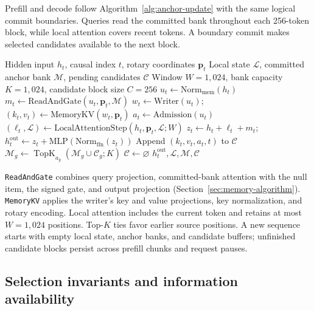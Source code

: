 Prefill and decode follow Algorithm~\ref{alg:anchor-update} with the same logical commit boundaries. Queries read the committed bank throughout each 256-token block, while local attention covers recent tokens. A boundary commit makes selected candidates available to the next block.

\begin{algorithm}[!htbp]
\caption{Causal RMA update in one local-plus-RMA layer}
\label{alg:anchor-update}
\small
\begin{algorithmic}[1]
\Require Hidden input $h_t$, causal index $t$, rotary coordinates $\mathbf p_t$
\Require Local state $\mathcal L$, committed anchor bank $\mathcal M$, pending candidates $\mathcal C$
\Require Window $W=1{,}024$, bank capacity $K=1{,}024$, candidate block size $C=256$
\State $u_t\gets\mathrm{Norm}_{\mathrm{mem}}(h_t)$
\State $m_t\gets\mathrm{ReadAndGate}(u_t,\mathbf p_t,\mathcal M)$ 
\State $w_t\gets\mathrm{Writer}(u_t)$; $(k_t,v_t)\gets\mathrm{MemoryKV}(w_t,\mathbf p_t)$
\State $a_t\gets\mathrm{Admission}(u_t)$ 
\State $(\ell_t,\mathcal L)\gets\mathrm{LocalAttentionStep}(h_t,\mathbf p_t,\mathcal L;W)$
\State $z_t\gets h_t+\ell_t+m_t$; $h_t^{\mathrm{out}}\gets z_t+\mathrm{MLP}(\mathrm{Norm}_{\mathrm{ffn}}(z_t))$
\State Append $(k_t,v_t,a_t,t)$ to $\mathcal C$
 
    \State $\mathcal M_g\gets\operatorname{TopK}_{a_g}(\mathcal M_g\cup\mathcal C_g;K)$
  \EndFor
  \State $\mathcal C\gets\varnothing$ 
\EndIf
\State \Return $h_t^{\mathrm{out}},\mathcal L,\mathcal M,\mathcal C$
\end{algorithmic}
\end{algorithm}

\texttt{ReadAndGate} combines query projection, committed-bank attention with the null item, the signed gate, and output projection (Section~\ref{sec:memory-algorithm}). \texttt{MemoryKV} applies the writer's key and value projections, key normalization, and rotary encoding. Local attention includes the current token and retains at most $W=1{,}024$ positions. Top-$K$ ties favor earlier source positions. A new sequence starts with empty local state, anchor banks, and candidate buffers; unfinished candidate blocks persist across prefill chunks and request pauses.

\subsection{Selection invariants and information availability}

